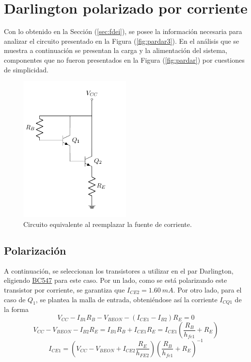 \section{Darlington polarizado por corriente}
Con lo obtenido en la Sección (\ref{sec:fdei}), se posee la información necesaria para analizar el circuito presentado en la Figura (\ref{fig:pardar3}). En el análisis que se muestra a continuación se presentan la carga y la alimentación del sistema, componentes que no fueron presentados en la Figura (\ref{fig:pardar}) por cuestiones de simplicidad.
\begin{figure}[H]
\centering
	\includegraphics[width=0.5\textwidth, page=5]{Imagenes/ParDarlington.pdf}
	\caption{Circuito equivalente al reemplazar la fuente de corriente.}
	\label{fig:pardar4}
\end{figure}

\subsection{Polarización}
A continuación, se seleccionan los transistores a utilizar en el par Darlington, eligiendo \href{https://www.sparkfun.com/datasheets/Components/BC546.pdf}{BC547} para este caso. Por un lado, como se está polarizando este transistor por corriente, se garantiza que $I_{CE2} = 1.60 \ mA$. Por otro lado, para el caso de $Q_1$, se plantea la malla de entrada, obteniéndose así la corriente $I_{CQ1}$ de la forma
\begin{equation*}
	V_{CC} - I_{B1} R_B - V_{BEON} - \left( I_{CE1} - I_{B2} \right) R_E = 0
\end{equation*}
\begin{equation*}
	V_{CC} - V_{BEON} - I_{B2} R_E = I_{B1} R_B + I_{CE1} R_E = I_{CE1} \left( \frac{R_B}{h_{fe1}} + R_E \right)
\end{equation*}
\begin{equation}
	I_{CE1} = \left( V_{CC} - V_{BEON} + I_{CE2} \frac{R_E}{h_{FE2}} \right) \left( \frac{R_B}{h_{fe1}} + R_E \right)^{-1}
\end{equation}

